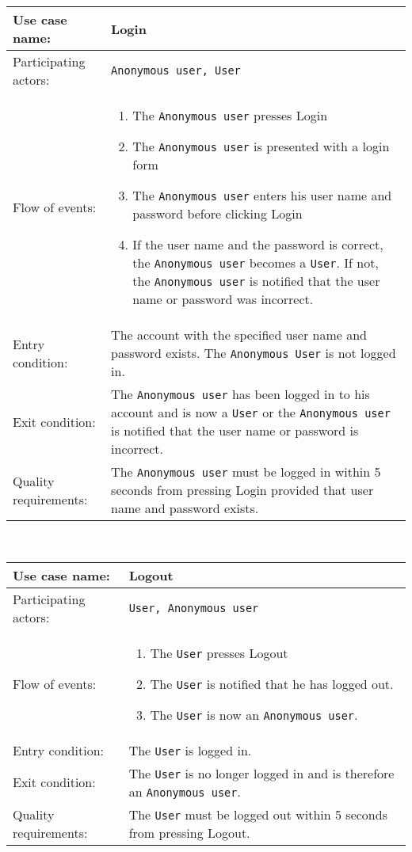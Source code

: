 \documentclass[../report.tex]{subfiles}
\begin{document}
\noindent
\begin{tabular}{| l | p{8cm} |}
  \hline                        
 Use case name:  & Login   \\   \hline                
 Participating actors:  & \texttt{Anonymous user, User} \\   \hline          
  Flow of events: & \begin{enumerate}
\item{The \texttt{Anonymous user} presses Login}
\item{The \texttt{Anonymous user} is presented with a login form}
\item{The \texttt{Anonymous user} enters his user name and password before clicking Login}
\item{If the user name and the password is correct, the \texttt{Anonymous user} becomes a \texttt{User}. If not, the \texttt{Anonymous user} is notified that the user name or password was incorrect.}
\end{enumerate}
 \\   \hline 
Entry condition: & The account with the specified user name and password exists. The \texttt{Anonymous User} is not logged in. \\ \hline
Exit condition: & The \texttt{Anonymous user} has been logged in to his account and is now a \texttt{User} or the \texttt{Anonymous user} is notified that the user name or password is incorrect. \\ \hline
Quality requirements: & The \texttt{Anonymous user} must be logged in within 5 seconds from pressing Login provided that user name and password exists. \\ \hline             
\end{tabular} \\

\noindent
\begin{tabular}{| l | p{8cm} |}
  \hline                        
 Use case name:  & Logout   \\   \hline                
 Participating actors:  & \texttt{User, Anonymous user} \\   \hline          
  Flow of events: & \begin{enumerate}
\item{The \texttt{User} presses Logout}
\item{The \texttt{User} is notified that he has logged out.}
\item{The \texttt{User} is now an \texttt{Anonymous user}.}
\end{enumerate}
 \\   \hline 
Entry condition: & The \texttt{User} is logged in. \\ \hline
Exit condition: & The \texttt{User} is no longer logged in and is therefore an \texttt{Anonymous user}. \\ \hline
Quality requirements: & The \texttt{User} must be logged out within 5 seconds from pressing Logout. \\ \hline             
\end{tabular} \\
\end{document}
